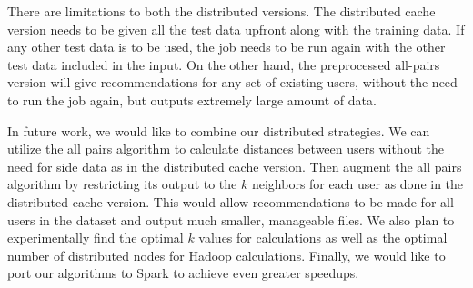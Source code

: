 \documentclass[conference, 12pt]{IEEEtran}
\begin{document}
There are limitations to both the distributed versions. The distributed cache version needs to be given all the test data upfront along with the training data. If any other test data is to be used, the job needs to be run again with the other test data included in the input. On the other hand, the preprocessed all-pairs version will give recommendations for any set of existing users, without the need to run the job again, but outputs extremely large amount of data.

In future work, we would like to combine our distributed strategies.  We can utilize the all pairs algorithm to calculate distances between users without the need for side data as in the distributed cache version.  Then augment the all pairs algorithm by restricting its output to the $k$ neighbors for each user as done in the distributed cache version.  This would allow recommendations to be made for all users in the dataset and output much smaller, manageable files.  We also plan to experimentally find the optimal $k$ values for calculations as well as the optimal number of distributed nodes for Hadoop calculations.  Finally, we would like to port our algorithms to Spark to achieve even greater speedups.

 


 


\end{document}
